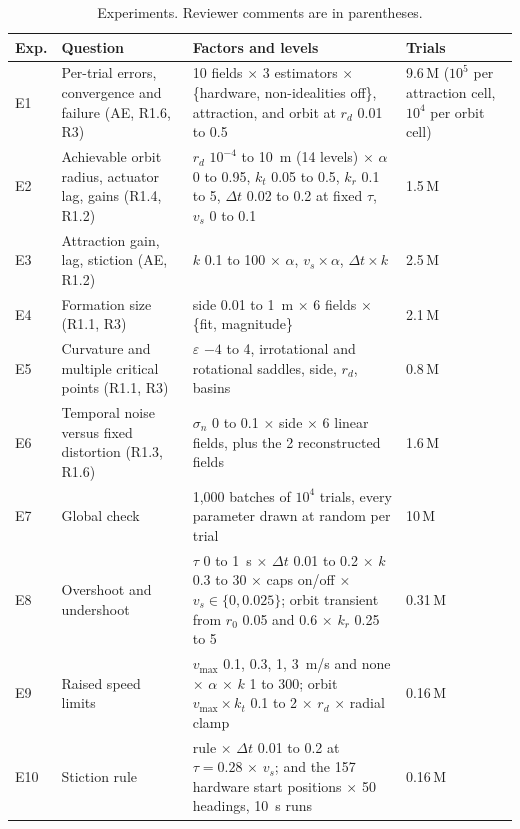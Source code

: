 \documentclass[10pt,letterpaper]{article}
\newcommand{\vmax}{v_{\max}}
\newcommand{\dt}{\Delta t}
\begin{document}
\begin{table}[htbp]
\centering\footnotesize
\caption{Experiments. Reviewer comments are in parentheses.}
\label{tab:exp}
\begin{tabularx}{\textwidth}{@{}l P{4.1cm} L P{3.1cm}@{}}
\toprule
Exp. & Question & Factors and levels & Trials \\
\midrule
E1 & Per-trial errors, convergence and failure (AE, R1.6, R3) & 10 fields $\times$ 3 estimators $\times$ \{hardware, non-idealities off\}, attraction, and orbit at $r_d$ 0.01 to 0.5 & 9.6\,M ($10^5$ per attraction cell, $10^4$ per orbit cell) \\
E2 & Achievable orbit radius, actuator lag, gains (R1.4, R1.2) & $r_d$ $10^{-4}$ to 10~m (14 levels) $\times$ $\alpha$ 0 to 0.95, $k_t$ 0.05 to 0.5, $k_r$ 0.1 to 5, $\dt$ 0.02 to 0.2 at fixed $\tau$, $v_s$ 0 to 0.1 & 1.5\,M \\
E3 & Attraction gain, lag, stiction (AE, R1.2) & $k$ 0.1 to 100 $\times$ $\alpha$, $v_s \times \alpha$, $\dt \times k$ & 2.5\,M \\
E4 & Formation size (R1.1, R3) & side 0.01 to 1~m $\times$ 6 fields $\times$ \{fit, magnitude\} & 2.1\,M \\
E5 & Curvature and multiple critical points (R1.1, R3) & $\varepsilon$ $-4$ to 4, irrotational and rotational saddles, side, $r_d$, basins & 0.8\,M \\
E6 & Temporal noise versus fixed distortion (R1.3, R1.6) & $\sigma_n$ 0 to 0.1 $\times$ side $\times$ 6 linear fields, plus the 2 reconstructed fields & 1.6\,M \\
E7 & Global check & 1,000 batches of $10^4$ trials, every parameter drawn at random per trial & 10\,M \\
E8 & Overshoot and undershoot & $\tau$ 0 to 1~s $\times$ $\dt$ 0.01 to 0.2 $\times$ $k$ 0.3 to 30 $\times$ caps on/off $\times$ $v_s \in \{0, 0.025\}$; orbit transient from $r_0$ 0.05 and 0.6 $\times$ $k_r$ 0.25 to 5 & 0.31\,M \\
E9 & Raised speed limits & $\vmax$ 0.1, 0.3, 1, 3~m/s and none $\times$ $\alpha$ $\times$ $k$ 1 to 300; orbit $\vmax \times k_t$ 0.1 to 2 $\times$ $r_d$ $\times$ radial clamp & 0.16\,M \\
E10 & Stiction rule & rule $\times$ $\dt$ 0.01 to 0.2 at $\tau = 0.28$ $\times$ $v_s$; and the 157 hardware start positions $\times$ 50 headings, 10~s runs & 0.16\,M \\
\bottomrule
\end{tabularx}
\end{table}
\end{document}
